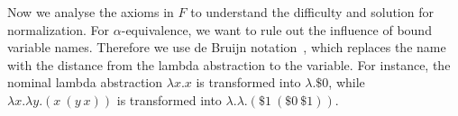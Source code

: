 


Now we analyse the axioms in $F$ to understand the difficulty and solution for normalization. 
For $\alpha$-equivalence, we want to rule out the influence of bound variable names. Therefore we use de Bruijn notation~\cite{deBruijn1972lambda}, which replaces the name with the distance from the lambda abstraction to the variable. For instance, the nominal lambda abstraction \( \lambda x. x \) is transformed into \( \lambda . \$0 \), while \( \lambda x. \lambda y. (x\ (y\ x)) \) is transformed into \( \lambda.\lambda. (\$1\ (\$0\ \$1)) \).

